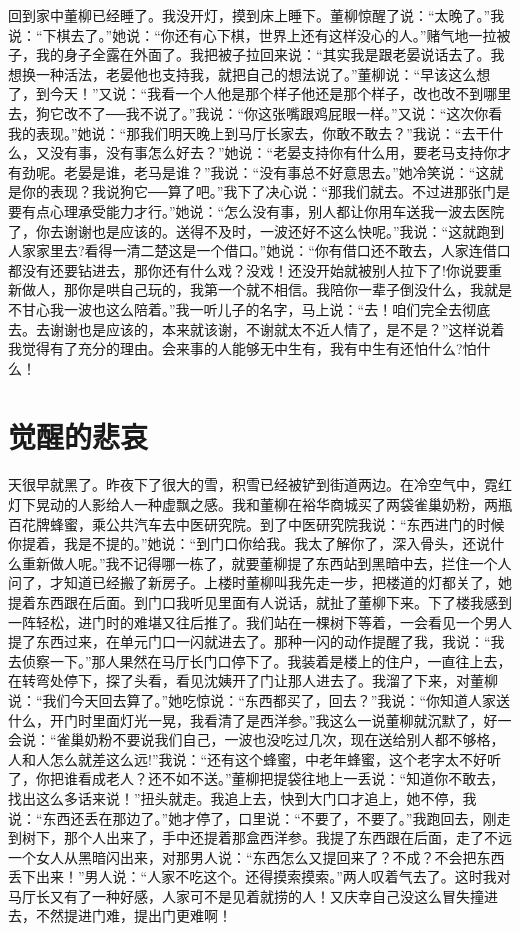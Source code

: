 \documentclass[12pt,oneside]{book}
\begin{document}
回到家中董柳已经睡了。我没开灯，摸到床上睡下。董柳惊醒了说：``太晚了。''我说：``下棋去了。''她说：``你还有心下棋，世界上还有这样没心的人。''赌气地一拉被子，我的身子全露在外面了。我把被子拉回来说：``其实我是跟老晏说话去了。我想换一种活法，老晏他也支持我，就把自己的想法说了。''董柳说：``早该这么想了，到今天！''又说：``我看一个人他是那个样子他还是那个样子，改也改不到哪里去，狗它改不了──我不说了。''我说：``你这张嘴跟鸡屁眼一样。''又说：``这次你看我的表现。''她说：``那我们明天晚上到马厅长家去，你敢不敢去？''我说：``去干什么，又没有事，没有事怎么好去？''她说：``老晏支持你有什么用，要老马支持你才有劲呢。老晏是谁，老马是谁？''我说：``没有事总不好意思去。''她冷笑说：``这就是你的表现？我说狗它──算了吧。''我下了决心说：``那我们就去。不过进那张门是要有点心理承受能力才行。''她说：``怎么没有事，别人都让你用车送我一波去医院了，你去谢谢也是应该的。送得不及时，一波还好不这么快呢。''我说：``这就跑到人家家里去?看得一清二楚这是一个借口。''她说：``你有借口还不敢去，人家连借口都没有还要钻进去，那你还有什么戏？没戏！还没开始就被别人拉下了!你说要重新做人，那你是哄自己玩的，我第一个就不相信。我陪你一辈子倒没什么，我就是不甘心我一波也这么陪着。''我一听儿子的名字，马上说：``去！咱们完全去彻底去。去谢谢也是应该的，本来就该谢，不谢就太不近人情了，是不是？''这样说着我觉得有了充分的理由。会来事的人能够无中生有，我有中生有还怕什么?怕什么！


\chapter{觉醒的悲哀}

天很早就黑了。昨夜下了很大的雪，积雪已经被铲到街道两边。在冷空气中，霓红灯下晃动的人影给人一种虚飘之感。我和董柳在裕华商城买了两袋雀巢奶粉，两瓶百花牌蜂蜜，乘公共汽车去中医研究院。到了中医研究院我说：``东西进门的时候你提着，我是不提的。''她说：``到门口你给我。我太了解你了，深入骨头，还说什么重新做人呢。''我不记得哪一栋了，就要董柳提了东西站到黑暗中去，拦住一个人问了，才知道已经搬了新房子。上楼时董柳叫我先走一步，把楼道的灯都关了，她提着东西跟在后面。到门口我听见里面有人说话，就扯了董柳下来。下了楼我感到一阵轻松，进门时的难堪又往后推了。我们站在一棵树下等着，一会看见一个男人提了东西过来，在单元门口一闪就进去了。那种一闪的动作提醒了我，我说：``我去侦察一下。''那人果然在马厅长门口停下了。我装着是楼上的住户，一直往上去，在转弯处停下，探了头看，看见沈姨开了门让那人进去了。我溜了下来，对董柳说：``我们今天回去算了。''她吃惊说：``东西都买了，回去？''我说：``你知道人家送什么，开门时里面灯光一晃，我看清了是西洋参。''我这么一说董柳就沉默了，好一会说：``雀巢奶粉不要说我们自己，一波也没吃过几次，现在送给别人都不够格，人和人怎么就差这么远!''我说：``还有这个蜂蜜，中老年蜂蜜，这个老字太不好听了，你把谁看成老人？还不如不送。''董柳把提袋往地上一丢说：``知道你不敢去，找出这么多话来说！''扭头就走。我追上去，快到大门口才追上，她不停，我说：``东西还丢在那边了。''她才停了，口里说：``不要了，不要了。''我跑回去，刚走到树下，那个人出来了，手中还提着那盒西洋参。我提了东西跟在后面，走了不远一个女人从黑暗闪出来，对那男人说：``东西怎么又提回来了？不成？不会把东西丢下出来！''男人说：``人家不吃这个。还得摸索摸索。''两人叹着气去了。这时我对马厅长又有了一种好感，人家可不是见着就捞的人！又庆幸自己没这么冒失撞进去，不然提进门难，提出门更难啊！
\end{document}
